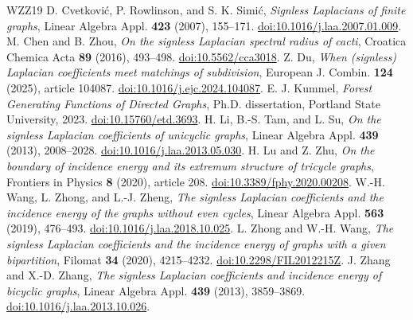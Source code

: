 \documentclass[12pt]{amsart}
\theoremstyle{definition}
\theoremstyle{remark}
\numberwithin{equation}{section}
\begin{document}
\begin{thebibliography}{WZZ19}
D. Cvetkovi\'c, P. Rowlinson, and S. K. Simi\'c,
\emph{Signless Laplacians of finite graphs}, Linear Algebra Appl.
\textbf{423} (2007), 155--171.
\href{https://doi.org/10.1016/j.laa.2007.01.009}{doi:10.1016/j.laa.2007.01.009}.
M. Chen and B. Zhou, \emph{On the signless Laplacian spectral radius of cacti},
Croatica Chemica Acta \textbf{89} (2016), 493--498.
\href{https://doi.org/10.5562/cca3018}{doi:10.5562/cca3018}.
Z. Du, \emph{When (signless) Laplacian coefficients meet matchings of subdivision},
European J. Combin. \textbf{124} (2025), article 104087.
\href{https://doi.org/10.1016/j.ejc.2024.104087}{doi:10.1016/j.ejc.2024.104087}.
E. J. Kummel, \emph{Forest Generating Functions of Directed Graphs},
Ph.D. dissertation, Portland State University, 2023.
\href{https://doi.org/10.15760/etd.3693}{doi:10.15760/etd.3693}.
H. Li, B.-S. Tam, and L. Su,
\emph{On the signless Laplacian coefficients of unicyclic graphs},
Linear Algebra Appl. \textbf{439} (2013), 2008--2028.
\href{https://doi.org/10.1016/j.laa.2013.05.030}{doi:10.1016/j.laa.2013.05.030}.
H. Lu and Z. Zhu, \emph{On the boundary of incidence energy and its extremum
structure of tricycle graphs}, Frontiers in Physics \textbf{8} (2020), article 208.
\href{https://doi.org/10.3389/fphy.2020.00208}{doi:10.3389/fphy.2020.00208}.
W.-H. Wang, L. Zhong, and L.-J. Zheng,
\emph{The signless Laplacian coefficients and the incidence energy of the graphs
without even cycles}, Linear Algebra Appl. \textbf{563} (2019), 476--493.
\href{https://doi.org/10.1016/j.laa.2018.10.025}{doi:10.1016/j.laa.2018.10.025}.
L. Zhong and W.-H. Wang,
\emph{The signless Laplacian coefficients and the incidence energy of graphs
with a given bipartition}, Filomat \textbf{34} (2020), 4215--4232.
\href{https://doi.org/10.2298/FIL2012215Z}{doi:10.2298/FIL2012215Z}.
J. Zhang and X.-D. Zhang,
\emph{The signless Laplacian coefficients and incidence energy of bicyclic graphs},
Linear Algebra Appl. \textbf{439} (2013), 3859--3869.
\href{https://doi.org/10.1016/j.laa.2013.10.026}{doi:10.1016/j.laa.2013.10.026}.
\end{thebibliography}
\end{document}
